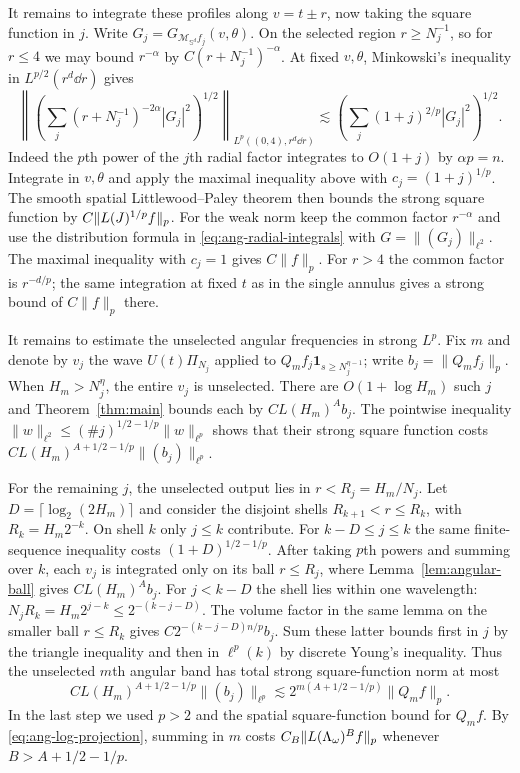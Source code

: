 It remains to integrate these profiles along $v=t\pm r$, now taking
the square function in $j$. Write $G_j=G_{\mathcal M_{\mathbb S^d}f_j}(v,\theta)$.
On the selected region $r\ge N_j^{-1}$, so for $r\le4$ we may bound
$r^{-\alpha}$ by $C(r+N_j^{-1})^{-\alpha}$. At fixed $v,\theta$,
Minkowski's inequality in $L^{p/2}(r^d\dd r)$ gives
\begin{equation}\label{eq:ang-log-integral}
 \left\|\left(\sum_j (r+N_j^{-1})^{-2\alpha}|G_j|^2\right)^{1/2}
        \right\|_{L^p((0,4),r^d\dd r)}
 \lesssim\left(\sum_j (1+j)^{2/p}|G_j|^2\right)^{1/2}.
\end{equation}
Indeed the $p$th power of the $j$th radial factor integrates to $O(1+j)$
by $\alpha p=n$. Integrate in $v,\theta$ and apply the maximal inequality
above with $c_j=(1+j)^{1/p}$. The smooth spatial Littlewood--Paley theorem
then bounds the strong square function by $C\|L(J)^{1/p}f\|_p$.
For the weak norm keep the common factor $r^{-\alpha}$ and use the
distribution formula in \eqref{eq:ang-radial-integrals} with
$G=\|(G_j)\|_{\ell^2}$. The maximal inequality with $c_j=1$ gives
$C\|f\|_p$. For $r>4$ the common factor is $r^{-d/p}$; the same
integration at fixed $t$ as in the single annulus gives a strong bound
of $C\|f\|_p$ there.

It remains to estimate the unselected angular frequencies in strong
$L^p$. Fix $m$ and denote by $v_j$ the wave $U(t)\Pi_{N_j}$ applied to
$Q_m f_j\mathbf1_{s\ge N_j^{\eta-1}}$; write $b_j=\|Q_m f_j\|_p$.
When $H_m>N_j^\eta$, the entire $v_j$ is unselected. There are
$O(1+\log H_m)$ such $j$ and Theorem~\ref{thm:main} bounds each by
$CL(H_m)^A b_j$. The pointwise inequality
$\|w\|_{\ell^2}\le (\#j)^{1/2-1/p}\|w\|_{\ell^p}$ shows that
their strong square function costs
$CL(H_m)^{A+1/2-1/p}\|(b_j)\|_{\ell^p}$.

For the remaining $j$, the unselected output lies in $r<R_j=H_m/N_j$.
Let $D=\lceil\log_2(2H_m)\rceil$ and consider the disjoint shells
$R_{k+1}<r\le R_k$, with $R_k=H_m2^{-k}$. On shell $k$ only $j\le k$
contribute. For $k-D\le j\le k$ the same finite-sequence inequality
costs $(1+D)^{1/2-1/p}$. After taking $p$th powers and summing over
$k$, each $v_j$ is integrated only on its ball $r\le R_j$, where
Lemma~\ref{lem:angular-ball} gives $CL(H_m)^A b_j$. For $j<k-D$ the
shell lies within one wavelength: $N_jR_k=H_m2^{j-k}\le2^{-(k-j-D)}$.
The volume factor in the same lemma on the smaller ball $r\le R_k$ gives
$C2^{-(k-j-D)n/p}b_j$. Sum these latter bounds first in $j$ by the
triangle inequality and then in $\ell^p(k)$ by discrete Young's
inequality. Thus the unselected $m$th angular band has total strong
square-function norm at most
\[
 C L(H_m)^{A+1/2-1/p}\|(b_j)\|_{\ell^p}
 \lesssim 2^{m(A+1/2-1/p)}\|Q_m f\|_p.
\]
In the last step we used $p>2$ and the spatial square-function bound
for $Q_m f$. By \eqref{eq:ang-log-projection}, summing in $m$ costs
$C_B\|L(\Lambda_\omega)^B f\|_p$ whenever $B>A+1/2-1/p$.


